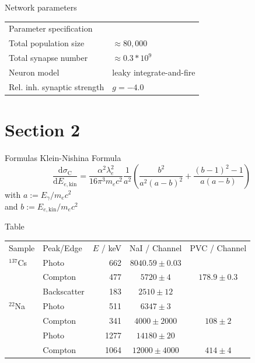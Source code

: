 \documentclass[xcolor=x11names,compress]{beamer}
\renewcommand{\(}{\begin{columns}}
\renewcommand{\)}{\end{columns}}
\newcommand{\<}[1]{\begin{column}{#1}}
\renewcommand{\>}{\end{column}}
\begin{document}
\begin{frame}[t]{Network parameters}
\begin{table}[htpb]
    \centering
    \label{tab:network_parameters}
    \begin{tabular}{l l}
        \rowcolor{LightCyan} Parameter specification & \\
        \cellcolor{LightCyan} Total population size & $\approx 80,000$\\
        \cellcolor{LightCyan} Total synapse number  & $\approx 0.3 * 10^9$\\
        \cellcolor{LightCyan} Neuron model& leaky integrate-and-fire\\
        \cellcolor{LightCyan} Rel. inh. synaptic strength & $g = -4.0$\\
    \end{tabular}
\end{table}
\end{frame}


\section{Section 2}
\begin{frame}[t]{Formulas}
    Klein-Nishina Formula
\begin{equation}
    \frac{\text{d} \sigma_\text{C}}{\text{d} E_{e, \text{kin}}} 
    = \frac{\alpha^2 \lambda_e^2}{16 \pi^3 m_e c^2}  \frac{1}{a^2}\left(
        \frac{b^2}{a^2(a - b)^2} + \frac{(b - 1)^2 - 1}{a (a - b)} \right) 
    \label{eq:dode}
\end{equation}
with $a := E_\gamma / m_ec^2$ \\ 
and $b := E_{e, \text{kin}} / m_ec^2$ 
\end{frame}

\begin{frame}[t]{Table}
\begin{table}[htpb]
    \centering
    \label{tab:mono_calibration}
    \begin{tabular}{l l r c c}
        \rowcolor{LightCyan} Sample & Peak/Edge & $E$ / keV& NaI / Channel & PVC / Channel \\
        \cellcolor{LightCyan}$^{137}$Cs & Photo & 662 & $8040.59 \pm 0.03$ &  \\
        \cellcolor{LightCyan} & Compton& 477& $5720 \pm 4$ &  $178.9 \pm 0.3$  \\
        \cellcolor{LightCyan} & Backscatter& 183&  $2510 \pm 12$ &  \\
        \cellcolor{LightCyan}$^{22}$Na & Photo& 511& $6347 \pm 3$&  \\
        \cellcolor{LightCyan} & Compton& 341& $4000 \pm 2000$& $108 \pm 2$  \\
        \cellcolor{LightCyan} & Photo& 1277& $14180 \pm 20 $& \\
        \cellcolor{LightCyan} & Compton& 1064& $12000 \pm 4000$& $414 \pm 4$ \\
    \end{tabular}
\end{table}
\end{frame}
\end{document}
